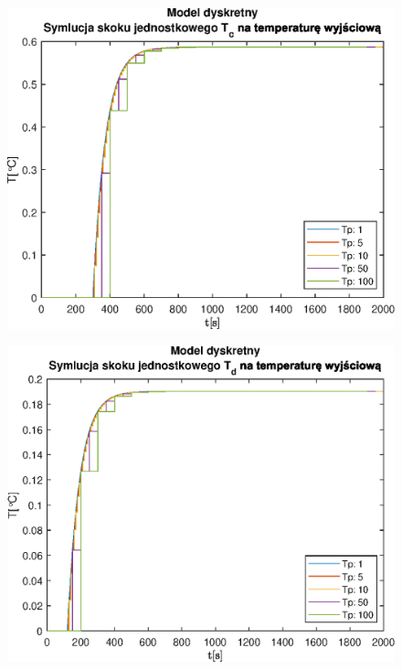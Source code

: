 \begin{figure}[h!]
   \centering
   \includegraphics{img/discrete-step-responses/TcT.eps}
   \caption{}
   \label{}
\end{figure}
            
\begin{figure}[h!]
   \centering
   \includegraphics{img/discrete-step-responses/TdT.eps}
   \caption{}
   \label{}
\end{figure}
            
